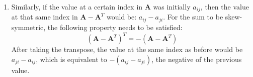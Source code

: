 \begin{sol}
\begin{enumerate}[label=\textbf{(\alph*)}]
    \item Similarly, if the value at a certain index in $\bm{A}$ was initially $a_{ij}$, then the value at that same index in $\bm{A}-\bm{A}^T$ would be: $a_{ij}-a_{ji}$. For the sum to be skew-symmetric, the following property needs to be satisfied:
    \begin{equation}
        (\bm{A}-\bm{A}^T)^T= -(\bm{A} - \bm{A}^T)
    \end{equation}
    After taking the transpose, the value at the same index as before would be $a_{ji}-a_{ij}$, which is equivalent to $-(a_{ij}-a_{ji})$, the negative of the previous value.
\end{enumerate}

\end{sol}